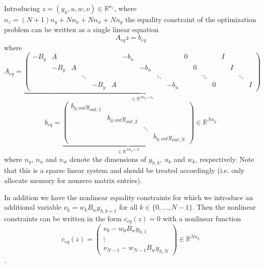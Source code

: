 \documentclass[
12pt, %
a4paper, %
onecolumn, %
portrait %
]{article}
\begin{document}
Introducing $z = (y_h, u, w, \nu) \in \mathbb{R}^{n_z}$, where $n_z = (N+1)n_y + N n_u  + N n_w + N n_y$ the equality constraint of the optimization problem can be written as a single linear equation 
\begin{equation}
A_{eq} z = b_{eq}
\label{eq:linear-system-constraints}
\end{equation}
where
\begin{equation}
A_{eq} =
\underbrace{\begin{pmatrix}
-B_y &    A &   &        & 		 &   & -b_u &      &        &      & 0 &   &       &   & I &   &        & \\
     & -B_y & A &        & 		 &   &      & -b_u &        &      &   & 0 &       &   &   & I &        & \\
     &      &   & \ddots &      &   &      &      & \ddots & 	    &   &   &\ddots &   &   &   & \ddots & \\
     &      &   &        & -B_y & A &      &      &        & -b_u &   &   &       & 0 &   &   &        & I 
\end{pmatrix}}_{
\in \mathbb{R}^{N n_y \times n_z}}
\end{equation}
\begin{equation}
b_{eq} = 
\underbrace{\begin{pmatrix}
b_{y,out}y_{out,1} & & & \\
& b_{y,out}y_{out,2} & &  \\
& & \ddots & \\
& & & b_{y,out}y_{out,N}
\end{pmatrix}}_{
\in \mathbb{R}^{N n_y \times N}
}
  \in \mathbb{R}^{N n_y}
\end{equation}
where $n_y$, $n_u$ and $n_w$ denote the dimensions of $y_{h,k}$, $u_k$ and $w_k$, respectively.
Note that this is a sparse linear system and should be treated accordingly (i.e. only allocate memory for nonzero matrix entries).

In addition we have the nonlinear equality constraints for which we introduce an additional variable $\nu_k = w_k B_w y_{h,k+1}$ for all $k \in \{0, \hdots, N-1\}$. Then the nonlinear constraints can be written in the form $c_{eq}(z) = 0$ with a nonlinear function
\begin{equation}
c_{eq}(z) =
\begin{pmatrix}
\nu_0 - w_0 B_w y_{h,1} \\
\vdots \\
\nu_{N-1} - w_{N-1} B_w y_{h,N}
\end{pmatrix} \in \mathbb{R}^{N n_y}
\label{eq:nonlinear-system-constraints}
\end{equation}.
\end{document}
